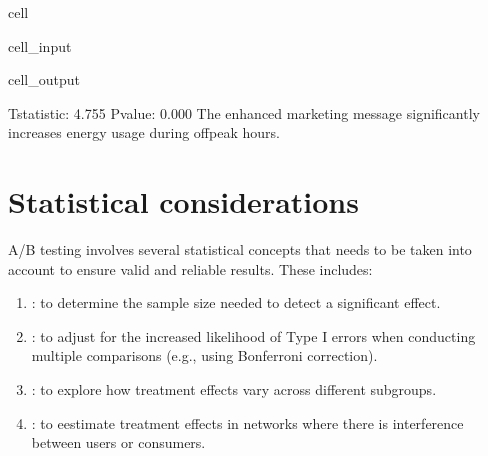 \documentclass[letterpaper,10pt,english]{jupyterBook}
\begin{document}
\begin{sphinxuseclass}{cell}
\begin{sphinxVerbatimInput}
\begin{sphinxuseclass}{cell_input}
\end{sphinxuseclass}\end{sphinxVerbatimInput}
\begin{sphinxVerbatimOutput}

\begin{sphinxuseclass}{cell_output}
\begin{sphinxVerbatim}[commandchars=\\\{\}]
T\PYGZhy{}statistic: 4.755
P\PYGZhy{}value: 0.000
The enhanced marketing message significantly increases energy usage during off\PYGZhy{}peak hours.
\end{sphinxVerbatim}

\end{sphinxuseclass}\end{sphinxVerbatimOutput}

\end{sphinxuseclass}

\section{Statistical considerations}
\label{\detokenize{notebooks/AB_testing:statistical-considerations}}
\sphinxAtStartPar
A/B testing involves several statistical concepts that needs to be taken into account to ensure valid and reliable results. These includes:
\begin{enumerate}
%
\item {} 
\sphinxAtStartPar
{}: to determine the sample size needed to detect a significant effect.

\item {} 
\sphinxAtStartPar
{}: to adjust for the increased likelihood of Type I errors when conducting multiple comparisons (e.g., using Bonferroni correction).

\item {} 
\sphinxAtStartPar
{}: to explore how treatment effects vary across different subgroups.

\item {} 
\sphinxAtStartPar
{}: to eestimate treatment effects in networks where there is interference between users or consumers.

\end{enumerate}
\end{document}
